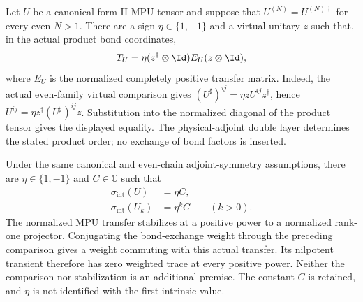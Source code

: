 \begin{lemma}
    \label{lem:mpu_canonical_twisted_transfer_comparison}
    \leanok
    Let $U$ be a canonical-form-II MPU tensor and suppose that
    $U^{(N)}=U^{(N)\dagger}$ for every even $N>1$.
    There are a sign $\eta\in\{1,-1\}$ and a virtual unitary $z$ such that,
    in the actual product bond coordinates,
    \[
        T_U=\eta(z^\dagger\otimes\Id)E_U(z\otimes\Id),
    \]
    where $E_U$ is the normalized completely positive transfer matrix.
    Indeed, the actual even-family virtual comparison gives
    $(U^\sharp)^{ij}=\eta zU^{ij}z^\dagger$, hence
    $U^{ij}=\eta z^\dagger(U^\sharp)^{ij}z$.
    Substitution into the normalized diagonal of the product tensor gives
    the displayed equality. The physical-adjoint double layer determines the
    stated product order; no exchange of bond factors is inserted.
\end{lemma}

\begin{lemma}
    \label{lem:mpu_canonical_intrinsic_blocking_phase_formula}
    \leanok
    Under the same canonical and even-chain adjoint-symmetry assumptions,
    there are $\eta\in\{1,-1\}$ and $C\in\mathbb C$ such that
    \begin{align}
        \sigma_{\mathrm{int}}(U)   & =\eta C,              \\
        \sigma_{\mathrm{int}}(U_k) & =\eta^k C\qquad(k>0).
    \end{align}
    The normalized MPU transfer stabilizes at a positive power to a
    normalized rank-one projector. Conjugating the bond-exchange weight
    through the preceding comparison gives a weight commuting with this
    actual transfer. Its nilpotent transient therefore has zero weighted
    trace at every positive power. Neither the comparison nor stabilization
    is an additional premise. The constant $C$ is retained, and $\eta$ is not
    identified with the first intrinsic value.
\end{lemma}

